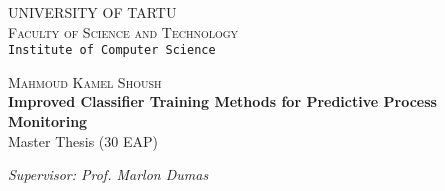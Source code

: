 \begin{titlepage}

\begin{center}



\textsc{UNIVERSITY OF TARTU}\\

\textsc{Faculty of Science and Technology}\\

\texttt{Institute of Computer Science}\\

\vspace{6 cm}


\textsc{ \large Mahmoud Kamel Shoush}\\[0.5cm]
{ \Huge \bfseries Improved Classifier Training Methods for Predictive Process Monitoring}\\[0.5cm]
{\large Master Thesis (30 EAP)}\\[3cm]




\begin{minipage}{0.8\textwidth}
\begin{flushright} \large
\emph{Supervisor: Prof. Marlon Dumas}  \\	  %
\end{flushright}
\end{minipage}

\textbf{}\\[1.0cm]


\end{center}
\end{titlepage}
